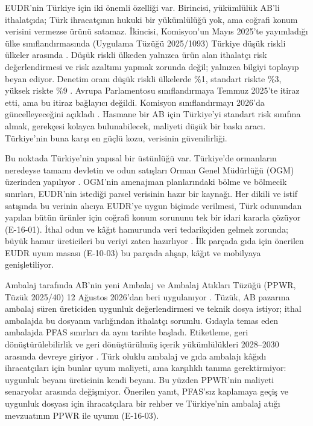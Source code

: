 EUDR'nin Türkiye için iki önemli özelliği var. Birincisi, yükümlülük AB'li ithalatçıda; Türk ihracatçının hukuki bir yükümlülüğü yok, ama coğrafi konum verisini vermezse ürünü satamaz. İkincisi, Komisyon'un Mayıs 2025'te yayımladığı ülke sınıflandırmasında (Uygulama Tüzüğü 2025/1093) Türkiye düşük riskli ülkeler arasında \etiketV{}. Düşük riskli ülkeden yalnızca ürün alan ithalatçı risk değerlendirmesi ve risk azaltımı yapmak zorunda değil; yalnızca bilgiyi toplayıp beyan ediyor. Denetim oranı düşük riskli ülkelerde \%1, standart riskte \%3, yüksek riskte \%9 \etiketV{}. Avrupa Parlamentosu sınıflandırmaya Temmuz 2025'te itiraz etti, ama bu itiraz bağlayıcı değildi. Komisyon sınıflandırmayı 2026'da güncelleyeceğini açıkladı \etiketV{}. Hasmane bir AB için Türkiye'yi standart risk sınıfına almak, gerekçesi kolayca bulunabilecek, maliyeti düşük bir baskı aracı. Türkiye'nin buna karşı en güçlü kozu, verisinin güvenilirliği.

Bu noktada Türkiye'nin yapısal bir üstünlüğü var. Türkiye'de ormanların neredeyse tamamı devletin ve odun satışları Orman Genel Müdürlüğü (OGM) üzerinden yapılıyor \etiketV{}. OGM'nin amenajman planlarındaki bölme ve bölmecik sınırları, EUDR'nin istediği parsel verisinin hazır bir kaynağı. Her dikili ve istif satışında bu verinin alıcıya EUDR'ye uygun biçimde verilmesi, Türk odunundan yapılan bütün ürünler için coğrafi konum sorununu tek bir idari kararla çözüyor (E-16-01). İthal odun ve kâğıt hamurunda veri tedarikçiden gelmek zorunda; büyük hamur üreticileri bu veriyi zaten hazırlıyor \etiketH{}. İlk parçada gıda için önerilen EUDR uyum masası (E-10-03) bu parçada ahşap, kâğıt ve mobilyaya genişletiliyor.

Ambalaj tarafında AB'nin yeni Ambalaj ve Ambalaj Atıkları Tüzüğü (PPWR, Tüzük 2025/40) 12 Ağustos 2026'dan beri uygulanıyor \etiketV{}. Tüzük, AB pazarına ambalaj süren üreticiden uygunluk değerlendirmesi ve teknik dosya istiyor; ithal ambalajda bu dosyanın varlığından ithalatçı sorumlu. Gıdayla temas eden ambalajda PFAS sınırları da aynı tarihte başladı. Etiketleme, geri dönüştürülebilirlik ve geri dönüştürülmüş içerik yükümlülükleri 2028--2030 arasında devreye giriyor \etiketV{}. Türk oluklu ambalaj ve gıda ambalajı kâğıdı ihracatçıları için bunlar uyum maliyeti, ama karşılıklı tanıma gerektirmiyor: uygunluk beyanı üreticinin kendi beyanı. Bu yüzden PPWR'nin maliyeti senaryolar arasında değişmiyor. Önerilen yanıt, PFAS'sız kaplamaya geçiş ve uygunluk dosyası için ihracatçılara bir rehber ve Türkiye'nin ambalaj atığı mevzuatının PPWR ile uyumu (E-16-03).

